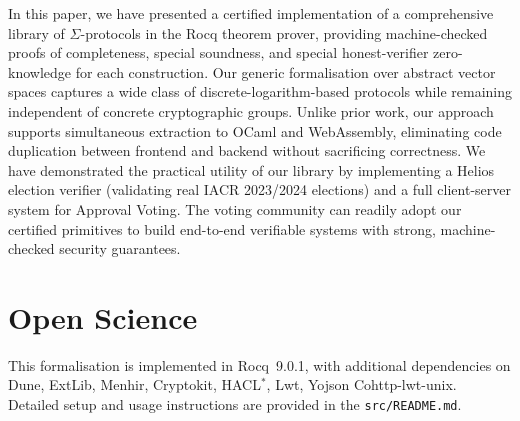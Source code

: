 \documentclass[sigconf, anonymous]{acmart}
\begin{document}
   In this paper, we have presented a certified implementation of a comprehensive library of $\Sigma$-protocols in the Rocq theorem prover, providing machine-checked proofs of completeness, special soundness, and special honest-verifier zero-knowledge for each construction. Our generic formalisation over abstract vector spaces captures a wide class of discrete-logarithm-based protocols while remaining independent of concrete cryptographic groups. Unlike prior work, our approach supports simultaneous extraction to OCaml and WebAssembly, eliminating code duplication between frontend and backend without sacrificing correctness. We have demonstrated the practical utility of our library by implementing a Helios election verifier (validating real IACR 2023/2024 elections) and a full client-server system for Approval Voting. The voting community can readily adopt our certified primitives to build end-to-end verifiable systems with strong, machine-checked security guarantees.







\appendix
\section{Open Science}
This formalisation is implemented in Rocq~9.0.1, with additional dependencies on Dune, ExtLib, Menhir, Cryptokit, HACL$^{*}$, Lwt, Yojson Cohttp-lwt-unix. Detailed setup and usage instructions are provided in the \texttt{src/README.md}.
\end{document}
